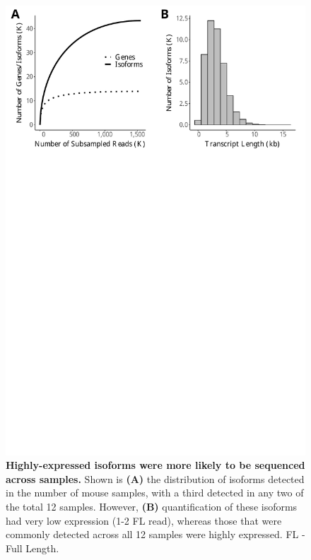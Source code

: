 \vspace{1cm}
\begin{figure}[!h]
	\begin{center}
		\includegraphics[page=2,trim={0 26cm 0 0},clip,scale = 0.55]{Figures/IsoSeqWholeTranscriptome.pdf}
	\end{center}
	\captionsetup{width=0.95\textwidth}
	\caption[Isoform diversity across the samples from global transcriptome profiling]%
	{\textbf{Highly-expressed isoforms were more likely to be sequenced across samples.} Shown is \textbf{(A)} the distribution of isoforms detected in the number of mouse samples, with a third detected in any two of the total 12 samples. However, \textbf{(B)} quantification of these isoforms had very low expression (1-2 FL read), whereas those that were commonly detected across all 12 samples were highly expressed. FL - Full Length.}
	\label{fig:isoseq_whole_lowlyexp}
\end{figure}


